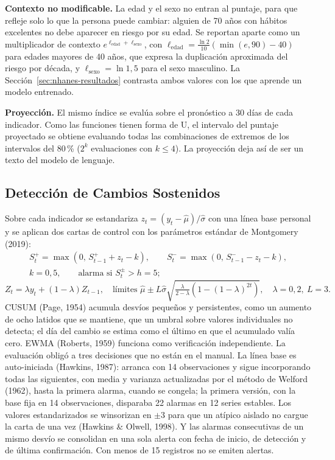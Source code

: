 \documentclass[12pt,letterpaper]{article}
\begin{document}
\textbf{Contexto no modificable.} La edad y el sexo no entran al puntaje, para
que refleje solo lo que la persona puede cambiar: alguien de 70 años con hábitos
excelentes no debe aparecer en riesgo por su edad. Se reportan aparte como un
multiplicador de contexto $e^{\ell_{\mathrm{edad}}+\ell_{\mathrm{sexo}}}$, con
$\ell_{\mathrm{edad}}=\frac{\ln 2}{10}(\min(e,90)-40)$ para edades mayores de 40
años, que expresa la duplicación aproximada del riesgo por década, y
$\ell_{\mathrm{sexo}}=\ln 1{,}5$ para el sexo masculino. La
Sección~\ref{sec:nhanes-resultados} contrasta ambos valores con los que aprende
un modelo entrenado.

\textbf{Proyección.} El mismo índice se evalúa sobre el pronóstico a 30 días de
cada indicador. Como las funciones tienen forma de U, el intervalo del puntaje
proyectado se obtiene evaluando todas las combinaciones de extremos de los
intervalos del 80\,\% ($2^k$ evaluaciones con $k\leq 4$). La proyección deja así
de ser un texto del modelo de lenguaje.

\subsection{Detección de Cambios Sostenidos}

Sobre cada indicador se estandariza $z_t=(y_t-\hat\mu)/\hat\sigma$ con una línea
base personal y se aplican dos cartas de control con los parámetros estándar de
Montgomery (2019):
\begin{gather*}
S^{+}_t=\max\!\left(0,\,S^{+}_{t-1}+z_t-k\right),\qquad
S^{-}_t=\max\!\left(0,\,S^{-}_{t-1}-z_t-k\right),\\
k=0{,}5,\qquad \text{alarma si } S^{\pm}_t>h=5;
\end{gather*}
\[
Z_t=\lambda y_t+(1-\lambda)Z_{t-1},\quad
\text{límites } \hat\mu \pm L\hat\sigma\sqrt{\tfrac{\lambda}{2-\lambda}\left(1-(1-\lambda)^{2t}\right)},\quad \lambda=0{,}2,\ L=3.
\]
CUSUM (Page, 1954) acumula desvíos pequeños y persistentes, como un aumento de
ocho latidos que se mantiene, que un umbral sobre valores individuales no
detecta; el día del cambio se estima como el último en que el acumulado valía
cero. EWMA (Roberts, 1959) funciona como verificación independiente. La
evaluación obligó a tres decisiones que no están en el manual. La línea base es
auto-iniciada (Hawkins, 1987): arranca con 14 observaciones y sigue incorporando
todas las siguientes, con media y varianza actualizadas por el método de
Welford (1962), hasta la primera alarma, cuando se congela; la primera versión,
con la base fija en 14 observaciones, disparaba 22 alarmas en 12 series estables.
Los valores estandarizados se winsorizan en $\pm 3$ para que un atípico aislado no
cargue la carta de una vez (Hawkins \& Olwell, 1998). Y las alarmas consecutivas
de un mismo desvío se consolidan en una sola alerta con fecha de inicio, de
detección y de última confirmación. Con menos de 15 registros no se emiten
alertas.
\end{document}
